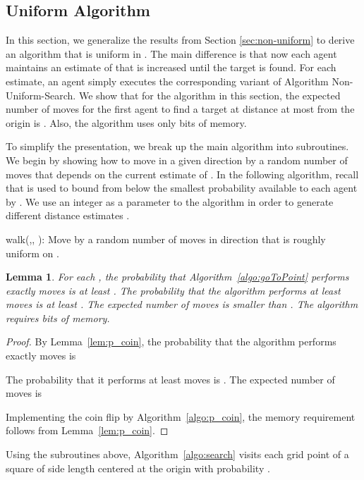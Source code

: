 \documentclass[11pt]{article}
\newtheorem{lemma}[theorem]{Lemma}
\begin{document}
\subsection{Uniform Algorithm}
\label{sec:uniform}

In this section, we generalize the results from Section \ref{sec:non-uniform} to derive an algorithm that is uniform in . The main difference is that now each agent maintains an estimate of  that is increased until the target is found. For each estimate, an agent simply executes the corresponding variant of Algorithm Non-Uniform-Search. We show that for the algorithm in this section, the expected number of moves for the first agent to find a target at distance at most  from the origin is . Also, the algorithm uses only  bits of memory.

To simplify the presentation, we break up the main algorithm into subroutines. We begin by showing how to move in a given direction by a random number of moves that depends on the current estimate  of . In the following algorithm, recall that  is used to bound from below the smallest probability available to each agent by . We use an integer  as a parameter to the algorithm in order to generate different distance estimates .

\begin{algorithm}
\caption{walk(,, ): Move by a random number of moves in direction  that is roughly uniform on .}
\label{algo:goToPoint}
\end{algorithm}


\begin{lemma}
\label{lem:walk}
	For each , the probability that Algorithm~\ref{algo:goToPoint} performs exactly  moves is at least . The probability that the algorithm performs at least  moves is at least . The expected number of moves is smaller than . The algorithm requires  bits of memory.  
\end{lemma}

\begin{proof}
By Lemma~\ref{lem:p_coin}, the probability that the algorithm performs exactly  moves is

The probability that it performs at least  moves is . The expected number of moves is

\noindent Implementing the coin flip by Algorithm~\ref{algo:p_coin}, the memory requirement follows from Lemma~\ref{lem:p_coin}.
\end{proof}

Using the subroutines above, Algorithm~\ref{algo:search} visits each grid point of a square of side length  centered at the origin with probability .
\end{document}
